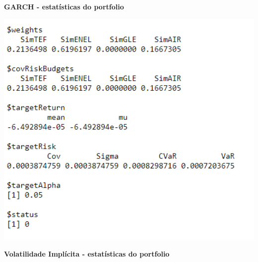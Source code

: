 \documentclass[
  12pt,
  a4paper,
  openany]{book}
\theoremstyle{definition}
\theoremstyle{definition}
\theoremstyle{definition}
\theoremstyle{remark}
\begin{document}
\newpage

\begin{center}
 {\normalfont\Large\bfseries GARCH - estatísticas do portfolio}
\end{center}

\begin{center}
\begin{minipage}{0.90\linewidth}
    \centering
    \includegraphics[width=2\textwidth]{image/garchport.png}
\end{minipage}
\end{center}

\newpage

\begin{center}
 {\normalfont\Large\bfseries Volatilidade Implícita -  estatísticas do portfolio}
\end{center}
\end{document}
